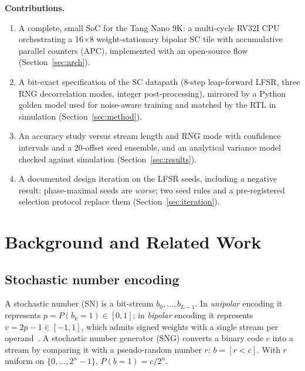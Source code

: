 \documentclass[conference]{IEEEtran}
\begin{document}
\textbf{Contributions.}
\begin{enumerate}
\item A complete, small SoC for the Tang Nano 9K: a multi-cycle
  RV32I CPU~\cite{riscv2019unpriv} orchestrating a 16$\times$8 weight-stationary
  bipolar SC tile with accumulative parallel counters (APC), implemented with
  an open-source flow~\cite{shah2019yosysnextpnr,yosys,apicula}
  (Section~\ref{sec:arch}).
\item A bit-exact specification of the SC datapath (8-step leap-forward LFSR,
  three RNG decorrelation modes, integer post-processing), mirrored by a
  Python golden model used for noise-aware training and matched by the RTL
  in simulation (Section~\ref{sec:method}).
\item An accuracy study versus stream length and RNG mode with confidence
  intervals and a 20-offset seed ensemble, and an analytical variance model
  checked against simulation (Section~\ref{sec:results}).
\item A documented design iteration on the LFSR seeds, including a negative
  result: phase-maximal seeds are \emph{worse}; two seed rules and a
  pre-registered selection protocol replace them (Section~\ref{sec:iteration}).
\end{enumerate}

\section{Background and Related Work}
\label{sec:background}

\subsection{Stochastic number encoding}
A stochastic number (SN) is a bit-stream $b_0,\dots,b_{L-1}$. In
\emph{unipolar} encoding it represents $p=P(b_k{=}1)\in[0,1]$; in
\emph{bipolar} encoding it represents $v = 2p-1 \in[-1,1]$, which admits signed
weights with a single stream per operand~\cite{gaines1969,alaghi2013survey}.
A stochastic number generator (SNG) converts a binary code $c$ into a stream by
comparing it with a pseudo-random number $r$: $b=[r<c]$. With $r$ uniform on
$\{0,\dots,2^n-1\}$, $P(b{=}1)=c/2^n$.
\end{document}
